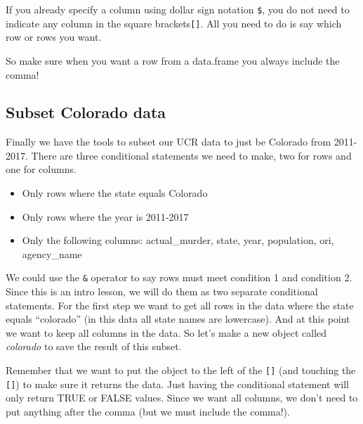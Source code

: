 \documentclass[
  12pt,
  openany]{book}
\newenvironment{Shaded}{\begin{snugshade}}{\end{snugshade}}
\newcommand{\CommentTok}[1]{\textcolor[rgb]{0.37,0.37,0.37}{\textit{#1}}}
\newcommand{\DecValTok}[1]{\textcolor[rgb]{0.06,0.06,0.06}{#1}}
\newcommand{\NormalTok}[1]{#1}
\newcommand{\SpecialCharTok}[1]{\textcolor[rgb]{0,0,0}{#1}}
\providecommand{\tightlist}{%
  \setlength{\itemsep}{0pt}\setlength{\parskip}{0pt}}
\begin{document}
If you already specify a column using dollar sign notation \texttt{\$}, you do not need to indicate any column in the square brackets\texttt{{[}{]}}. All you need to do is say which row or rows you want.

\begin{Shaded}
\end{Shaded}

So make sure when you want a row from a data.frame you always include the comma!

\hypertarget{subset-colorado-data}{%
\subsection{Subset Colorado data}\label{subset-colorado-data}}

Finally we have the tools to subset our UCR data to just be Colorado from 2011-2017. There are three conditional statements we need to make, two for rows and one for columns.

\begin{itemize}
\tightlist
\item
  Only rows where the state equals Colorado
\item
  Only rows where the year is 2011-2017
\item
  Only the following columns: actual\_murder, state, year, population, ori, agency\_name
\end{itemize}

We could use the \texttt{\&} operator to say rows must meet condition 1 and condition 2. Since this is an intro lesson, we will do them as two separate conditional statements. For the first step we want to get all rows in the data where the state equals ``colorado'' (in this data all state names are lowercase). And at this point we want to keep all columns in the data. So let's make a new object called \emph{colorado} to save the result of this subset.

Remember that we want to put the object to the left of the \texttt{{[}{]}} (and touching the \texttt{{[}{]}}) to make sure it returns the data. Just having the conditional statement will only return TRUE or FALSE values. Since we want all columns, we don't need to put anything after the comma (but we must include the comma!).
\end{document}
